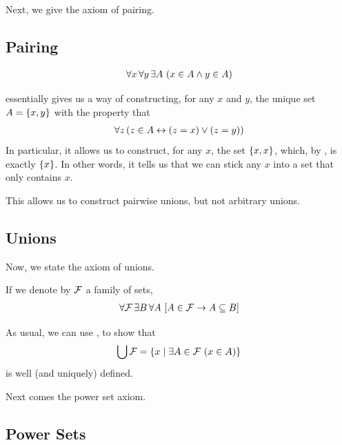 Next, we give the axiom of pairing.

\subsection{Pairing}

\begin{baxiom}\label{ZFC:Pairing}
    \begin{align*}
        \forall x \, \forall y \, \exists A \, \left( x \in A \land y \in A \right)
    \end{align*}
\end{baxiom}

 essentially gives us a way of constructing, for any $x$ and $y$, the unique set $A = \left\{ x, y \right\}$ with the property that
\begin{align*}
    \forall z \left( z \in A \leftrightarrow \left( z = x \right) \lor \left( z = y \right) \right)
\end{align*}
In particular, it allows us to construct, for any $x$, the set $\left\{ x, x \right\}$, which, by , is exactly $\left\{ x \right\}$. In other words, it tells us that we can stick any $x$ into a set that only contains $x$.

This allows us to construct pairwise unions, but not arbitrary unions.

\subsection{Unions}

Now, we state the axiom of unions.

\begin{baxiom}
    If we denote by $\mathcal{F}$ a family of sets,
    \begin{align*}
        \forall \mathcal{F} \, \exists B \, \forall A \, \left[ A \in \mathcal{F} \to A \subseteq B \right]
    \end{align*}
\end{baxiom}

As usual, we can use ,  to show that
\begin{align*}
    \bigcup \mathcal{F} = \left\{ x \; \middle\vert \; \exists A \in \mathcal{F} \, \left( x \in A \right) \right\}
\end{align*}
is well (and uniquely) defined.

Next comes the power set axiom.

\subsection{Power Sets}

